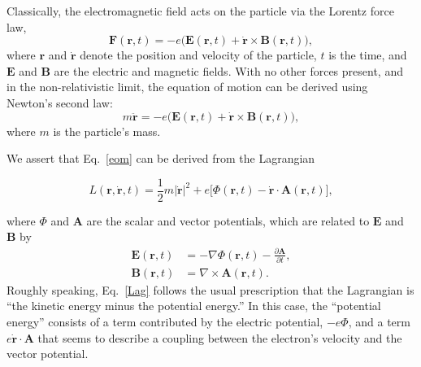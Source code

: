 \documentclass[prx,12pt]{revtex4-2}
\begin{document}
Classically, the electromagnetic field acts on the particle via the
Lorentz force law,
\begin{equation}
  \mathbf{F}(\mathbf{r},t) = -e\Big(\mathbf{E}(\mathbf{r},t)
  + \dot{\mathbf{r}}\times \mathbf{B}(\mathbf{r},t)\Big),
\end{equation}
where $\mathbf{r}$ and $\dot{\mathbf{r}}$ denote the position and
velocity of the particle, $t$ is the time, and $\mathbf{E}$ and
$\mathbf{B}$ are the electric and magnetic fields.  With no other
forces present, and in the non-relativistic limit, the equation of
motion can be derived using Newton's second law:
\begin{equation}
  m\ddot{\mathbf{r}} = -e\Big(\mathbf{E}(\mathbf{r},t)
  + \dot{\mathbf{r}} \times \mathbf{B}(\mathbf{r},t)\Big),
  \label{eom}
\end{equation}
where $m$ is the particle's mass.

We assert that Eq.~\eqref{eom} can be derived from the Lagrangian
\begin{framed}
\begin{equation}
  L(\mathbf{r},\dot{\mathbf{r}},t) = \frac{1}{2}m |\dot{\mathbf{r}}|^2
  + e \Big[\Phi(\mathbf{r},t) - \dot{\mathbf{r}} \cdot \mathbf{A}(\mathbf{r},t)
    \Big],
  \label{Lag}
\end{equation}
\end{framed}
\noindent
where $\Phi$ and $\mathbf{A}$ are the scalar and vector potentials,
which are related to $\mathbf{E}$ and $\mathbf{B}$ by
\begin{align}
  \mathbf{E}(\mathbf{r},t) &= - \nabla \Phi(\mathbf{r},t) - \frac{\partial\mathbf{A}}{\partial t}, \label{Efield0} \\
  \mathbf{B}(\mathbf{r},t) &= \nabla \times \mathbf{A}(\mathbf{r},t).
  \label{Bfield0}
\end{align}
Roughly speaking, Eq.~\eqref{Lag} follows the usual prescription that
the Lagrangian is ``the kinetic energy minus the potential energy.''
In this case, the ``potential energy'' consists of a term contributed
by the electric potential, $-e\Phi$, and a term $e\dot{\mathbf{r}}
\cdot \mathbf{A}$ that seems to describe a coupling between the
electron's velocity and the vector potential.
\end{document}
